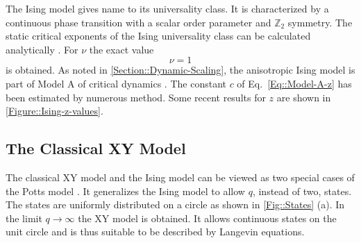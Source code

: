 	The Ising model gives name to its universality class. It is characterized by a continuous phase transition with a scalar order parameter and $\mathbb{Z}_2$ symmetry. The static critical exponents of the Ising universality class can be calculated analytically \cite{cardy1996scaling}. For $\nu$ the exact value
	\begin{equation}
		\nu =	1
	\end{equation}
	is obtained. As noted in \autoref{Section::Dynamic-Scaling}, the anisotropic Ising model is part of Model A of critical dynamics \cite{hohenberg1977theory}. The constant $c$ of Eq.~\eqref{Eq::Model-A-z} has been estimated by numerous method. Some recent results for $z$ are shown in \autoref{Figure::Ising-z-values}. \\
	\subsection{The Classical XY Model}
	The classical XY model and the Ising model can be viewed as two special cases of the Potts model \cite{potts1952some}. It generalizes the Ising model to allow $q$, instead of two, states. The states are uniformly distributed on a circle as shown in \autoref{Fig::States} (a). In the limit $q \rightarrow \infty$ the XY model is obtained. It allows continuous states on the unit circle and is thus suitable to be described by Langevin equations. \\
	
